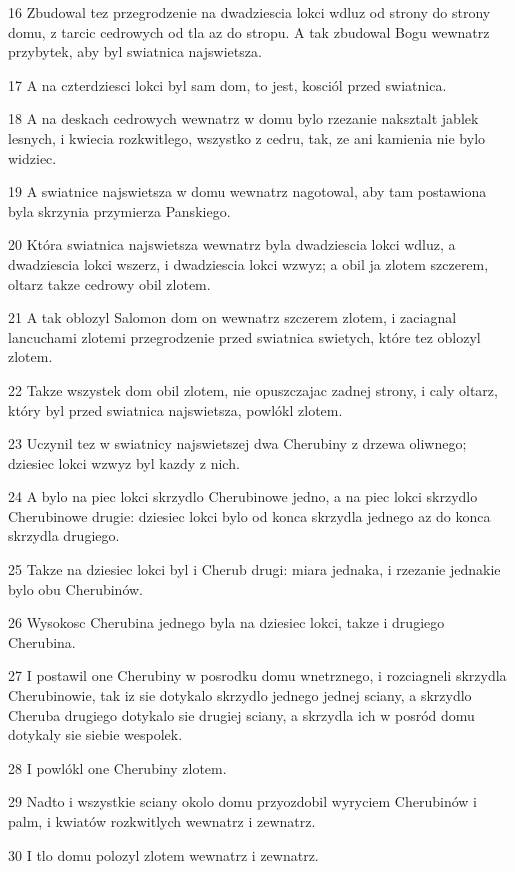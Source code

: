 \par 16 Zbudowal tez przegrodzenie na dwadziescia lokci wdluz od strony do strony domu, z tarcic cedrowych od tla az do stropu. A tak zbudowal Bogu wewnatrz przybytek, aby byl swiatnica najswietsza.
\par 17 A na czterdziesci lokci byl sam dom, to jest, kosciól przed swiatnica.
\par 18 A na deskach cedrowych wewnatrz w domu bylo rzezanie naksztalt jablek lesnych, i kwiecia rozkwitlego, wszystko z cedru, tak, ze ani kamienia nie bylo widziec.
\par 19 A swiatnice najswietsza w domu wewnatrz nagotowal, aby tam postawiona byla skrzynia przymierza Panskiego.
\par 20 Która swiatnica najswietsza wewnatrz byla dwadziescia lokci wdluz, a dwadziescia lokci wszerz, i dwadziescia lokci wzwyz; a obil ja zlotem szczerem, oltarz takze cedrowy obil zlotem.
\par 21 A tak oblozyl Salomon dom on wewnatrz szczerem zlotem, i zaciagnal lancuchami zlotemi przegrodzenie przed swiatnica swietych, które tez oblozyl zlotem.
\par 22 Takze wszystek dom obil zlotem, nie opuszczajac zadnej strony, i caly oltarz, który byl przed swiatnica najswietsza, powlókl zlotem.
\par 23 Uczynil tez w swiatnicy najswietszej dwa Cherubiny z drzewa oliwnego; dziesiec lokci wzwyz byl kazdy z nich.
\par 24 A bylo na piec lokci skrzydlo Cherubinowe jedno, a na piec lokci skrzydlo Cherubinowe drugie: dziesiec lokci bylo od konca skrzydla jednego az do konca skrzydla drugiego.
\par 25 Takze na dziesiec lokci byl i Cherub drugi: miara jednaka, i rzezanie jednakie bylo obu Cherubinów.
\par 26 Wysokosc Cherubina jednego byla na dziesiec lokci, takze i drugiego Cherubina.
\par 27 I postawil one Cherubiny w posrodku domu wnetrznego, i rozciagneli skrzydla Cherubinowie, tak iz sie dotykalo skrzydlo jednego jednej sciany, a skrzydlo Cheruba drugiego dotykalo sie drugiej sciany, a skrzydla ich w posród domu dotykaly sie siebie wespolek.
\par 28 I powlókl one Cherubiny zlotem.
\par 29 Nadto i wszystkie sciany okolo domu przyozdobil wyryciem Cherubinów i palm, i kwiatów rozkwitlych wewnatrz i zewnatrz.
\par 30 I tlo domu polozyl zlotem wewnatrz i zewnatrz.

